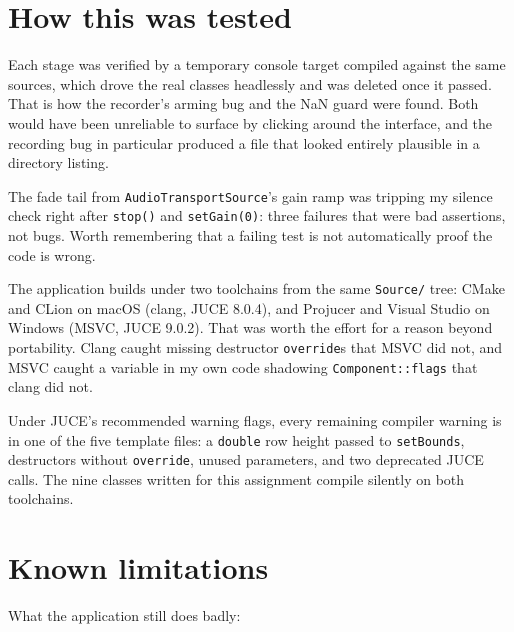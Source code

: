 \documentclass[11pt,a4paper]{article}
\newcommand{\code}[1]{\texttt{#1}}
\begin{document}
\section{How this was tested}

Each stage was verified by a temporary console target compiled against the same
sources, which drove the real classes headlessly and was deleted once it passed.
That is how the recorder's arming bug and the NaN guard were found. Both would
have been unreliable to surface by clicking around the interface, and the
recording bug in particular produced a file that looked entirely plausible in a
directory listing.

The fade tail from \code{AudioTransportSource}'s gain ramp was tripping my
silence check right after \code{stop()} and \code{setGain(0)}: three failures that
were bad assertions, not bugs. Worth remembering that a failing test is not
automatically proof the code is wrong.

The application builds under two toolchains from the same \code{Source/} tree:
CMake and CLion on macOS (clang, JUCE 8.0.4), and Projucer and Visual Studio on
Windows (MSVC, JUCE 9.0.2). That was worth the effort for a reason beyond
portability. Clang caught missing destructor \code{override}s that MSVC did not,
and MSVC caught a variable in my own code shadowing \code{Component::flags} that
clang did not.

Under JUCE's recommended warning flags, every remaining compiler warning is in
one of the five template files: a \code{double} row height passed to
\code{setBounds}, destructors without \code{override}, unused parameters, and two
deprecated JUCE calls. The nine classes written for this assignment compile
silently on both toolchains.

\section{Known limitations}

What the application still does badly:
\end{document}

